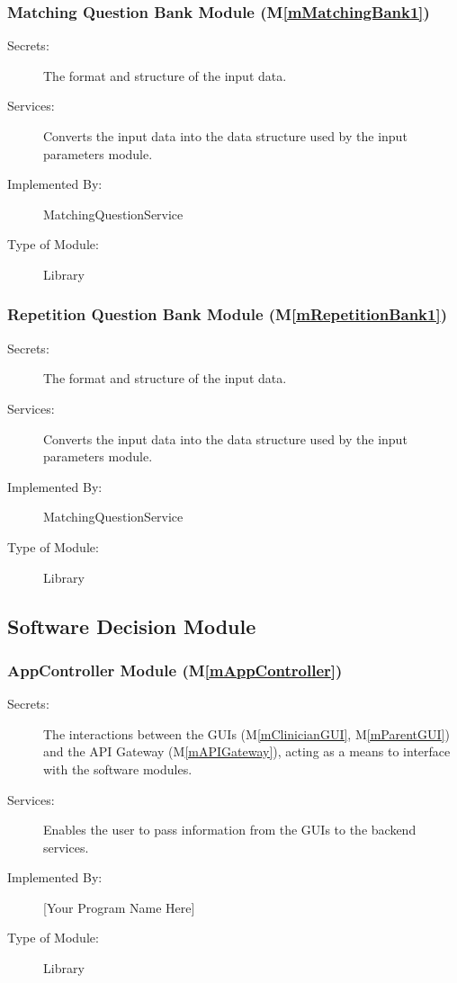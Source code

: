 \documentclass[12pt, titlepage]{article}
\newcommand{\mref}[1]{M\ref{#1}}
\begin{document}
\subsubsection{Matching Question Bank Module (\mref{mMatchingBank1})}

\begin{description}
\item[Secrets:]The format and structure of the input data.
\item[Services:]Converts the input data into the data structure used by the
  input parameters module.
\item[Implemented By:] MatchingQuestionService
\item[Type of Module:] Library
\end{description}

\subsubsection{Repetition Question Bank Module (\mref{mRepetitionBank1})}

\begin{description}
\item[Secrets:]The format and structure of the input data.
\item[Services:]Converts the input data into the data structure used by the
  input parameters module.
\item[Implemented By:] MatchingQuestionService
\item[Type of Module:] Library
\end{description}

\subsection{Software Decision Module}

  \subsubsection{AppController Module (\mref{mAppController})}
  
  \begin{description}
    \item[Secrets:]The interactions between the GUIs (\mref{mClinicianGUI}, \mref{mParentGUI}) and the API Gateway (\mref{mAPIGateway}), acting as a means to interface with the software modules.
    \item[Services:]Enables the user to pass information from the GUIs to the backend services.
    \item[Implemented By:] [Your Program Name Here]
    \item[Type of Module:] Library
    \end{description}
  
\end{document}
